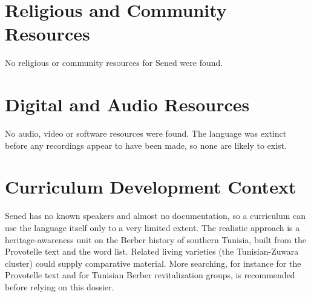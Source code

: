\documentclass[12pt]{article}
\begin{document}
\section{Religious and Community Resources}
No religious or community resources for Sened were found.

\section{Digital and Audio Resources}
No audio, video or software resources were found. The language was extinct before any recordings appear to have been made, so none are likely to exist.

\section{Curriculum Development Context}
Sened has no known speakers and almost no documentation, so a curriculum can use the language itself only to a very limited extent. The realistic approach is a heritage-awareness unit on the Berber history of southern Tunisia, built from the Provotelle text and the word list. Related living varieties (the Tunisian-Zuwara cluster) could supply comparative material. More searching, for instance for the Provotelle text and for Tunisian Berber revitalization groups, is recommended before relying on this dossier.
\end{document}
